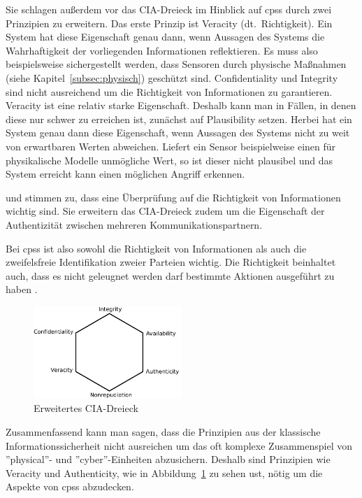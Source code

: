 \documentclass[final,bibliography=totocnumbered]{include/sikseminar}
\begin{document}
Sie schlagen außerdem vor das CIA-Dreieck im Hinblick auf \glspl{cps} durch zwei Prinzipien zu erweitern.
Das erste Prinzip ist Veracity (dt.~Richtigkeit).
Ein System hat diese Eigenschaft genau dann, wenn Aussagen des Systems die Wahrhaftigkeit der vorliegenden Informationen reflektieren.
Es muss also beispielsweise sichergestellt werden, dass Sensoren durch physische Maßnahmen (siehe Kapitel~\ref{subsec:physisch}) geschützt sind.
Confidentiality und Integrity sind nicht ausreichend um die Richtigkeit von Informationen zu garantieren.
Veracity ist eine relativ starke Eigenschaft.
Deshalb kann man in Fällen, in denen diese nur schwer zu erreichen ist, zunächst auf Plausibility setzen.
Herbei hat ein System genau dann diese Eigenschaft, wenn Aussagen des Systems nicht zu weit von erwartbaren Werten abweichen.
Liefert ein Sensor beispielweise einen für physikalische Modelle unmögliche Wert, so ist dieser nicht plausibel und das System erreicht kann einen möglichen Angriff erkennen. \cite{GK16}

\citeauthor{WYX+10} und \citeauthor{SFJ2017} stimmen zu, dass eine Überprüfung auf die Richtigkeit von Informationen wichtig sind.
Sie erweitern das CIA-Dreieck zudem um die Eigenschaft der Authentizität zwischen mehreren Kommunikationspartnern.

Bei \glspl{cps} ist also sowohl die Richtigkeit von Informationen als auch die zweifelsfreie Identifikation zweier Parteien wichtig.
Die Richtigkeit beinhaltet auch, dass es nicht geleugnet werden darf bestimmte Aktionen ausgeführt zu haben \cite{NIST2013}.

\begin{figure}
    \centering
    \includegraphics[width=0.5\textwidth]{figure/triad}
    \caption{Erweitertes CIA-Dreieck}
    \label{fig:triad}
\end{figure}

Zusammenfassend kann man sagen, dass die Prinzipien aus der klassische Informationssicherheit nicht ausreichen um das oft komplexe Zusammenspiel von ''physical''- und ''cyber''-Einheiten abzusichern.
Deshalb sind Prinzipien wie Veracity und Authenticity, wie in Abbildung~\ref{fig:triad} zu sehen ust, nötig um die Aspekte von \glspl{cps} abzudecken.
\end{document}
